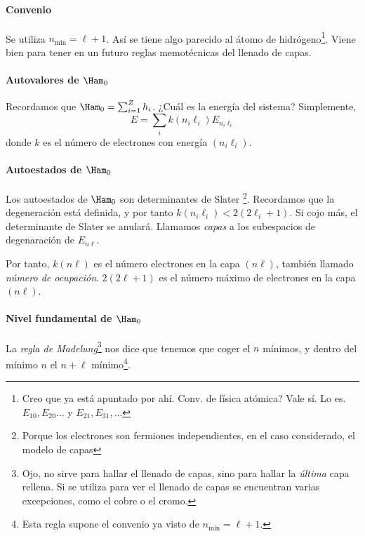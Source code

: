 \paragraph{Convenio}
Se utiliza $n_{\text{min}}=\ell+1$. Así se tiene algo parecido al átomo
de hidrógeno\footnote{Creo que ya está apuntado por ahí. Conv. de
  física atómica? Vale sí. Lo es. $E_{10},E_{20}\ldots$ y
  $E_{21},E_{31},\ldots$}. Viene bien para tener en un futuro reglas memotécnicas del
llenado de capas.

\paragraph{Autovalores de $\Ham_0$}
Recordamos que $\Ham_0 = \sum_{i=1}^Zh_i$. ¿Cuál es la energía del
sistema? Simplemente,
\begin{equation}
  E = \sum_{i} k(n_i\ell_i) E_{n_i\ell_i}
\end{equation}
donde $k$ es el número de electrones con energía $(n_i\ell_i)$. 
\paragraph{Autoestados de $\Ham_0$}
Los autoestados de $\Ham_0$ son determinantes de Slater
\footnote{Porque los electrones son fermiones independientes, en el
  caso considerado, el modelo de capas}.
Recordamos que la degeneración está definida, y por tanto
$k(n_i\ell_i)<2(2\ell_i+1)$. Si cojo más, el determinante de Slater se anulará.
Llamamos \emph{capas} a los subespacios de degenaración de $E_{n\ell}$.


Por tanto, $k(n\ell)$ es el número electrones en la capa $(n\ell)$, también
llamado \emph{número de ocupación}.
$2(2\ell+1)$ es el número máximo de electrones en la capa $(n\ell)$.


\paragraph{Nivel fundamental de $\Ham_0$}
La \emph{regla de Madelung}\footnote{Ojo, no sirve para hallar el
  llenado de capas, sino para hallar la \emph{última} capa rellena.
  Si se utiliza para ver el llenado de capas se encuentran varias
  excepciones, como el cobre o el cromo.} nos dice que tenemos que coger el $n$
mínimos, y dentro del mínimo $n$ el $n+\ell$ mínimo\footnote{Esta regla
  supone el convenio ya visto de $n_{\text{min}}=\ell+1$.}.

